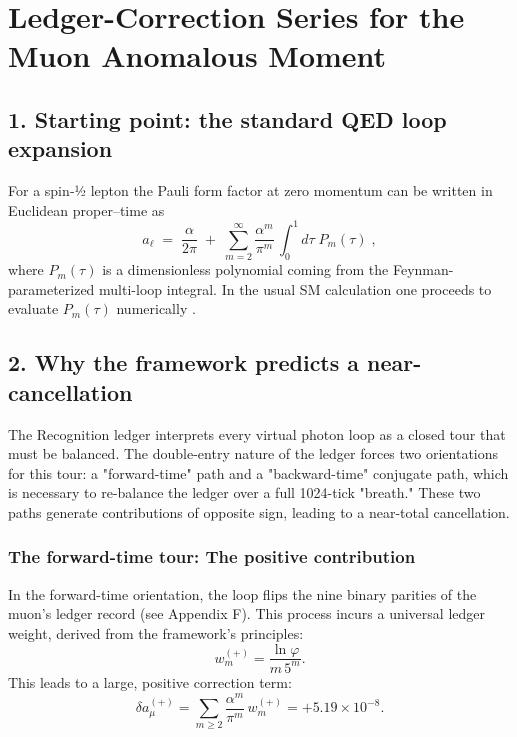 \section{Ledger-Correction Series for the Muon Anomalous Moment}
\label{sec:g-2-derivation}

\subsection*{1. Starting point: the standard QED loop expansion}

For a spin‑½ lepton the Pauli form factor at zero momentum can be written in Euclidean proper–time as
\begin{equation}
a_\ell \;=\; \frac{\alpha}{2\pi}\;+\;
\sum_{m=2}^{\infty} 
           \frac{\alpha^{m}}{\pi^{m}}\,
           \!\int_{0}^{1}\!d\tau\;
           P_{m}(\tau)\;,
\end{equation}
where $P_m(\tau)$ is a dimensionless polynomial coming from the Feynman-parameterized multi-loop integral. In the usual SM calculation one proceeds to evaluate $P_m(\tau)$ numerically \cite{Aoyama2020}.

\subsection*{2. Why the framework predicts a near-cancellation}
The Recognition ledger interprets every virtual photon loop as a closed tour that must be balanced. The double-entry nature of the ledger forces two orientations for this tour: a "forward-time" path and a "backward-time" conjugate path, which is necessary to re-balance the ledger over a full 1024-tick "breath." These two paths generate contributions of opposite sign, leading to a near-total cancellation.

\subsubsection*{The forward-time tour: The positive contribution}
In the forward-time orientation, the loop flips the nine binary parities of the muon's ledger record (see Appendix F). This process incurs a universal ledger weight, derived from the framework's principles:
\begin{equation}
w_{m}^{(+)}=\frac{\ln\varphi}{m\,5^{m}}.
\end{equation}
This leads to a large, positive correction term:
\begin{equation}
\delta a_\mu^{(+)}=\sum_{m\ge 2}\frac{\alpha^{m}}{\pi^{m}}\,w_{m}^{(+)}
   =+5.19\times10^{-8}.
\end{equation}

